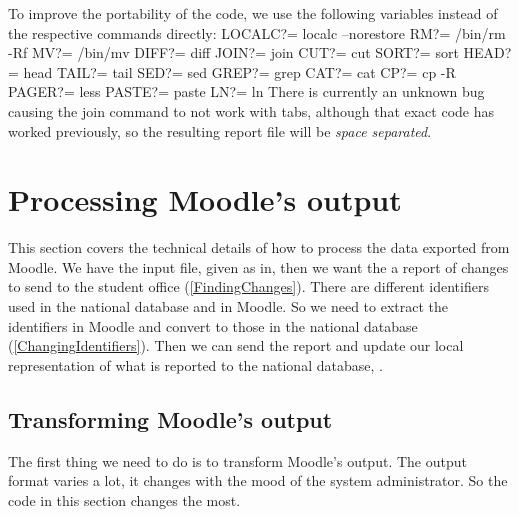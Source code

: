 To improve the portability of the code, we use the following variables instead 
of the respective commands directly:
\nwenddocs{}\plusendmoddef\nwstartdeflinemarkup{}\nwenddeflinemarkup
LOCALC?=  localc --norestore
RM?=      /bin/rm -Rf
MV?=      /bin/mv
DIFF?=    diff
JOIN?=    join
CUT?=     cut
SORT?=    sort
HEAD?=    head
TAIL?=    tail
SED?=     sed
GREP?=    grep
CAT?=     cat
CP?=      cp -R
PAGER?=   less
PASTE?=   paste
LN?=      ln
\nwendcode{}There is currently an unknown bug causing the join command to not work with 
tabs, although that exact code has worked previously, so the resulting report 
file will be \emph{space separated}.


\section{Processing Moodle's output}

This section covers the technical details of how to process the data exported 
from Moodle.
We have the input file, given as {\Tt{}{\$}{\nwlbrace}in{\nwrbrace}\nwendquote}, then we want the a report of 
changes to send to the student office (\cref{FindingChanges}).
There are different identifiers used in the national database and in Moodle.
So we need to extract the identifiers in Moodle and convert to those in the 
national database (\cref{ChangingIdentifiers}).
Then we can send the report and update our local representation of what is 
reported to the national database, .

\subsection{Transforming Moodle's output}

The first thing we need to do is to transform Moodle's output.
The output format varies a lot, it changes with the mood of the system 
administrator.
So the code in this section changes the most.

